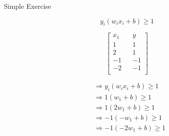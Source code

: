 \documentclass{beamer}
\begin{document}
\begin{frame}{Simple Exercise}
\begin{tcolorbox}

\begin{equation*}
y_{i}(w_{i}x_{i} + b) \geq 1
\end{equation*}
\end{tcolorbox}
\begin{multicols}{2}
\begin{equation*}
\begin{bmatrix}
x_{1} && y \\
1 && 1\\
2 && 1\\
-1 && -1\\
-2 && -1\\
\end{bmatrix}
\end{equation*}\break

\begin{align*}
&\Rightarrow y_{i}(w_{i}x_{i} + b) \geq 1\\
&\Rightarrow 1(w_{1} + b) \geq 1\\
&\Rightarrow 1(2w_{1} + b)\geq 1\\
&\Rightarrow -1(-w_{1}+b) \geq 1\\
&\Rightarrow -1(-2w_{1}+b) \geq 1\\
\end{align*}


\end{multicols}
\end{frame}
\end{document}

